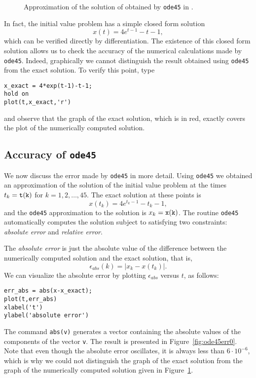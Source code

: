 \begin{figure}[htb]
   \centerline{%
   }
   \caption{Approximation of the solution of
   \protect{} obtained by {\tt ode45} in \protect\Matlabp.}
   \label{fig:ode45ex1}
\end{figure}

In fact, the initial value problem  has a simple closed form 
solution
\[
x(t) = 4e^{t-1}-t-1,
\]
which can be verified directly by differentiation.  The existence of this
closed form solution allows us to check the accuracy of the numerical
calculations made by {\tt ode45}.  Indeed, graphically we cannot distinguish 
the result obtained using {\tt ode45} from the exact 
solution.  To verify this point, type
\begin{verbatim}
x_exact = 4*exp(t-1)-t-1;
hold on
plot(t,x_exact,'r')
\end{verbatim}
and observe that the graph of the exact solution, which is in red, exactly
covers the plot of the numerically computed solution.

\subsection*{Accuracy of {\tt ode45}}

We now discuss the error made by {\tt ode45} in more detail.
Using {\tt ode45} we obtained an approximation of the solution of
the initial value problem  at the times $t_k={\tt t(k)}$
for $k=1,2,\ldots,45$.  The exact solution at these points is
\[
x(t_k)=4e^{t_k-1}-t_k-1,
\]
and the {\tt ode45} approximation to the solution is $x_k={\tt x(k)}$.  The 
routine {\tt ode45} automatically computes the solution subject to satisfying 
two constraints: {\em absolute error} and {\em relative error\/}.

The {\em absolute error} is just the absolute value of
the difference between the numerically computed solution and the exact
solution, that is,
\[
\epsilon_{abs}(k) = |x_k - x(t_k)|.
\]
We can visualize the absolute error by plotting $\epsilon_{abs}$ versus $t$, 
as follows:
\begin{verbatim}
err_abs = abs(x-x_exact);
plot(t,err_abs)
xlabel('t')
ylabel('absolute error')
\end{verbatim}
The \Matlab command {\tt abs(v)} generates a vector containing the absolute 
values of the components of the vector {\tt v}.  The result is presented in 
Figure~\ref{fig:ode45err0}.  Note that even though the absolute error 
oscillates, it is always less than $6\cdot10^{-6}$, which is why we could not 
distinguish the graph of the exact solution from the graph of the numerically 
computed solution given in Figure~\ref{fig:ode45ex1}.

